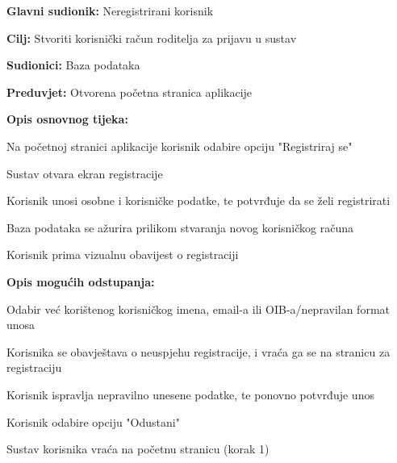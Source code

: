 					\begin{packed_item}
						
						\item \textbf{Glavni sudionik: }Neregistrirani korisnik
						\item  \textbf{Cilj:} Stvoriti korisnički račun roditelja za prijavu u sustav
						\item  \textbf{Sudionici:} Baza podataka
						\item  \textbf{Preduvjet:} Otvorena početna stranica aplikacije
						\item  \textbf{Opis osnovnog tijeka:}
						
						\item[] \begin{packed_enum}
							
							\item Na početnoj stranici aplikacije korisnik odabire opciju "Registriraj se"
							\item Sustav otvara ekran registracije
							\item Korisnik unosi osobne i korisničke podatke, te potvrđuje da se želi registrirati
							\item Baza podataka se ažurira prilikom stvaranja novog korisničkog računa
							\item Korisnik prima vizualnu obavijest o registraciji
						\end{packed_enum}
						
						\item  \textbf{Opis mogućih odstupanja:}
						\item[] \begin{packed_item}
							\item[2.a] Odabir već korištenog korisničkog imena, email-a ili OIB-a/nepravilan format unosa
							\item[] \begin{packed_enum}
								\item Korisnika se obavještava o neuspjehu registracije, i vraća ga se na stranicu za registraciju
								\item Korisnik ispravlja nepravilno unesene podatke, te ponovno potvrđuje unos
							\end{packed_enum}
							\item[3.a] Korisnik odabire opciju "Odustani"
							\item[] \begin{packed_enum}
								\item Sustav korisnika vraća na početnu stranicu (korak 1)
							\end{packed_enum}
							
						\end{packed_item}
					\end{packed_item}
					
